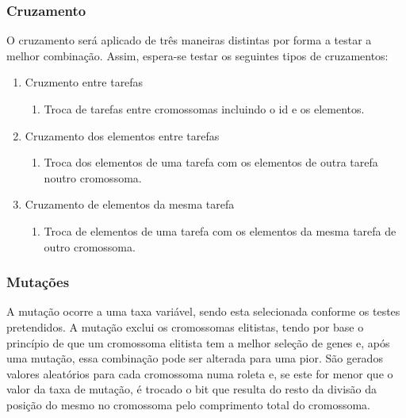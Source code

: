 \begin{titlepage}
\subsubsection{Cruzamento}

O cruzamento será aplicado de três maneiras distintas por forma a testar a melhor combinação. Assim, espera-se testar os seguintes tipos de cruzamentos:

\begin{enumerate}
	\item Cruzmento entre tarefas
		\begin{enumerate}
			\item Troca de tarefas entre cromossomas incluindo o id e os elementos.
		\end{enumerate}
	\item Cruzamento dos elementos entre tarefas
		\begin{enumerate}
			\item Troca dos elementos de uma tarefa com os elementos de outra tarefa noutro cromossoma.
		\end{enumerate}
	\item Cruzamento de elementos da mesma tarefa
		\begin{enumerate}
			\item Troca de elementos de uma tarefa com os elementos da mesma tarefa de outro cromossoma.
		\end{enumerate}
\end{enumerate}

\subsubsection{Mutações}

A mutação ocorre a uma taxa variável, sendo esta selecionada conforme os testes pretendidos. A mutação exclui os cromossomas elitistas, tendo por base o princípio de que um cromossoma elitista tem a melhor seleção de genes e, após uma mutação, essa combinação pode ser alterada para uma pior. São gerados valores aleatórios para cada cromossoma numa roleta e, se este for menor que o valor da taxa de mutação, é trocado o bit que resulta do resto da divisão da posição do mesmo no cromossoma pelo comprimento total do cromossoma.



\end{titlepage}
